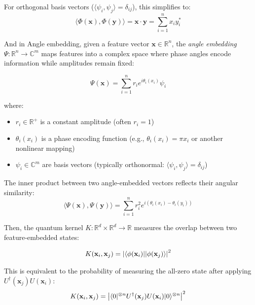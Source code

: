 \documentclass[12pt,a4paper]{article}
\DeclarePairedDelimiter\bra{\langle}{\rvert}
\DeclarePairedDelimiter\ket{\lvert}{\rangle}
\begin{document}
	For orthogonal basis vectors ($\langle \psi_i, \psi_j \rangle = \delta_{ij}$), this simplifies to:
	\begin{equation}
		\langle \Phi(\mathbf{x}), \Phi(\mathbf{y}) \rangle = \mathbf{x} \cdot \mathbf{y} = \sum_{i=1}^n x_i y_i^*
	\end{equation}
	
	And in Angle embedding, given a feature vector $\mathbf{x} \in \mathbb{R}^n$, the \textit{angle embedding} $\Psi: \mathbb{R}^n \to \mathbb{C}^m$ maps features into a complex space where phase angles encode information while amplitudes remain fixed:
	
	\begin{equation}
		\Psi(\mathbf{x}) = \sum_{i=1}^{n} r_i e^{i \theta_i(x_i)} \psi_i
	\end{equation}
	
	where:
	\begin{itemize}
		\item $r_i \in \mathbb{R}^+$ is a constant amplitude (often $r_i = 1$)
		\item $\theta_i(x_i)$ is a phase encoding function (e.g., $\theta_i(x_i) = \pi x_i$ or another nonlinear mapping)
		\item $\psi_i \in \mathbb{C}^m$ are basis vectors (typically orthonormal: $\langle \psi_i, \psi_j \rangle = \delta_{ij}$)
	\end{itemize}
	
	The inner product between two angle-embedded vectors reflects their angular similarity:
	\begin{equation}
		\langle \Psi(\mathbf{x}), \Psi(\mathbf{y}) \rangle = \sum_{i=1}^{n} r_i^2 e^{i (\theta_i(x_i) - \theta_i(y_i))}
	\end{equation}
	
	Then, the quantum kernel $K: \mathbb{R}^d \times \mathbb{R}^d \to \mathbb{R}$ measures the overlap between two feature-embedded states:
	
	\begin{equation}
		K(\mathbf{x}_i, \mathbf{x}_j) = \left| \bra{\phi(\mathbf{x}_i)} \ket{\phi(\mathbf{x}_j)} \right|^2
	\end{equation}
	
	This is equivalent to the probability of measuring the all-zero state after applying $U^\dagger(\mathbf{x}_j)U(\mathbf{x}_i)$:
	\begin{equation}
		K(\mathbf{x}_i, \mathbf{x}_j) = \left| \bra{0}^{\otimes n} U^\dagger(\mathbf{x}_j) U(\mathbf{x}_i) \ket{0}^{\otimes n} \right|^2
	\end{equation}
	
\end{document}
